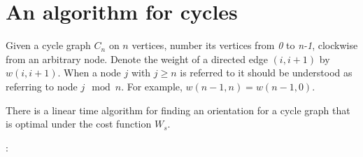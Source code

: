 \section{An algorithm for cycles}\label{s.c}
Given a cycle graph $C_n$ on $n$ vertices, number its vertices from \textit{0} to \textit{n-1}, 
clockwise from an arbitrary node. 
Denote the weight of a directed
edge $(i,i+1)$ by $w(i,i+1)$. When a node $j$ with $j\geq n$ is referred to it 
should be understood as referring to node $j \mod n$. 
For example, $w(n-1,n)=w(n-1,0)$.

\begin{theorem}
	There is a linear time algorithm for finding an orientation for a cycle graph that is optimal	under the cost function $W_s$.
\end{theorem}
:

